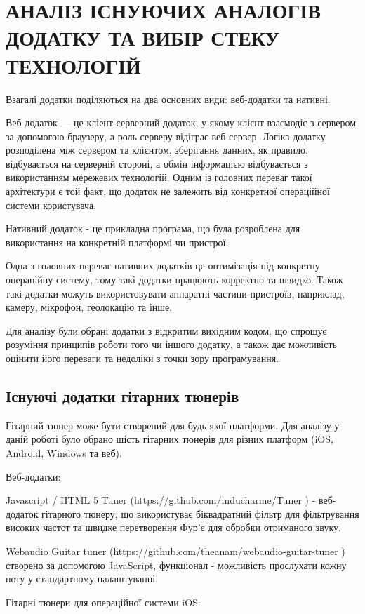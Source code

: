 \section{АНАЛІЗ ІСНУЮЧИХ АНАЛОГІВ ДОДАТКУ ТА ВИБІР СТЕКУ ТЕХНОЛОГІЙ}

Взагалі додатки поділяються на два основних види: веб-додатки та нативні.

Веб-додаток — це кліент-серверний додаток, у якому клієнт взаємодіє з сервером за допомогою браузеру, а роль серверу відіграє веб-сервер. Логіка додатку розподілена між сервером та клієнтом, зберігання данних, як правило, відбувається на серверній стороні, а обмін інформацією відбувається з використанням мережевих технологій. Одним із головних переваг такої архітектури є той факт, що додаток не залежить від конкретної операційної системи користувача.

Нативний додаток - це прикладна програма, що була розроблена для використання на конкретній платформі чи пристрої.

Одна з головних переваг нативних додатків це оптимізація під конкретну операційну систему, тому такі додатки працюють корректно та швидко. Також такі додатки можуть використовувати аппаратні частини пристроїв, наприклад, камеру, мікрофон, геолокацію та інше.

Для аналізу були обрані додатки з відкритим вихідним кодом, що спрощує розуміння принципів роботи того чи іншого додатку, а також дає можливість оцінити його переваги та недоліки з точки зору програмування.

\subsection{Існуючі додатки гітарних тюнерів}

Гітарний тюнер може бути створений для будь-якої платформи. Для аналізу у даній роботі було обрано шість гітарних тюнерів для різних платформ (iOS, Android, Windows та веб).

Веб-додатки:

Javascript / HTML 5 Tuner (https://github.com/mducharme/Tuner
) - веб-додаток гітарного тюнеру, що використуває біквадратний фільтр для фільтрування високих частот та швидке перетворення Фур'є для обробки отриманого звуку.

Webaudio Guitar tuner (https://github.com/theanam/webaudio-guitar-tuner
) створено за допомогою JavaScript, функціонал - можливість прослухати кожну ноту у стандартному налаштуванні. 

Гітарні тюнери для операційної системи iOS:

